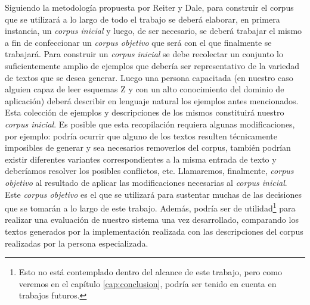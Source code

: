 Siguiendo la metodología propuesta por Reiter y Dale, para construir el corpus que se utilizará a lo largo de todo el trabajo se deberá elaborar, en primera instancia, un \emph{corpus inicial} y luego, de ser necesario, se deberá trabajar el mismo a fin de confeccionar un \emph{corpus objetivo} que será con el que finalmente se trabajará. Para construir un \emph{corpus inicial} se debe recolectar un conjunto lo suficientemente amplio de ejemplos que debería ser representativo de la variedad de textos que se desea generar. Luego una persona capacitada (en nuestro caso alguien capaz de leer esquemas Z y con un alto conocimiento del dominio de aplicación) deberá describir en lenguaje natural los ejemplos antes mencionados. Esta colección de ejemplos y descripciones de los mismos constituirá nuestro \emph{corpus inicial}. Es posible que esta recopilación requiera algunas modificaciones, por ejemplo: podría ocurrir que alguno de los textos resulten técnicamente imposibles de generar y sea necesarios removerlos del corpus, también podrían existir diferentes variantes correspondientes a la misma entrada de texto y deberíamos resolver los posibles conflictos, etc. Llamaremos, finalmente, \emph{corpus objetivo} al resultado de aplicar las modificaciones necesarias al \emph{corpus inicial}. Este \emph{corpus objetivo} es el que se utilizará para sustentar muchas de las decisiones que se tomarán a lo largo de este trabajo. Además, podría ser de utilidad\footnote{Esto no está contemplado dentro del alcance de este trabajo, pero como veremos en el capítulo \ref{cap:conclusion}, podría ser tenido en cuenta en trabajos futuros.} para realizar una evaluación de nuestro sistema una vez desarrollado, comparando los textos generados por la implementación realizada con las descripciones del corpus realizadas por la persona especializada.

